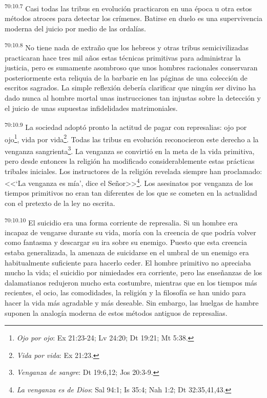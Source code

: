 \documentclass[twoside, 11pt]{book}
\begin{document}
\par
\textsuperscript{70:10.7} Casi todas las tribus en evolución practicaron en una época u otra estos métodos atroces para detectar los crímenes. Batirse en duelo es una supervivencia moderna del juicio por medio de las ordalías.

\par
\textsuperscript{70:10.8} No tiene nada de extraño que los hebreos y otras tribus semicivilizadas practicaran hace tres mil años estas técnicas primitivas para administrar la justicia, pero es sumamente asombroso que unos hombres racionales conservaran posteriormente esta reliquia de la barbarie en las páginas de una colección de escritos sagrados. La simple reflexión debería clarificar que ningún ser divino ha dado nunca al hombre mortal unas instrucciones tan injustas sobre la detección y el juicio de unas supuestas infidelidades matrimoniales.

\par
\textsuperscript{70:10.9} La sociedad adoptó pronto la actitud de pagar con represalias: ojo por ojo\footnote{\textit{Ojo por ojo}: Ex 21:23-24; Lv 24:20; Dt 19:21; Mt 5:38.}, vida por vida\footnote{\textit{Vida por vida}: Ex 21:23.}. Todas las tribus en evolución reconocieron este derecho a la venganza sangrienta\footnote{\textit{Venganza de sangre}: Dt 19:6,12; Jos 20:3-9.}. La venganza se convirtió en la meta de la vida primitiva, pero desde entonces la religión ha modificado considerablemente estas prácticas tribales iniciales. Los instructores de la religión revelada siempre han proclamado: <<`La venganza es mía', dice el Señor>>\footnote{\textit{La venganza es de Dios}: Sal 94:1; Is 35:4; Nah 1:2; Dt 32:35,41,43.}. Los asesinatos por venganza de los tiempos primitivos no eran tan diferentes de los que se cometen en la actualidad con el pretexto de la ley no escrita.

\par
\textsuperscript{70:10.10} El suicidio era una forma corriente de represalia. Si un hombre era incapaz de vengarse durante su vida, moría con la creencia de que podría volver como fantasma y descargar su ira sobre su enemigo. Puesto que esta creencia estaba generalizada, la amenaza de suicidarse en el umbral de un enemigo era habitualmente suficiente para hacerlo ceder. El hombre primitivo no apreciaba mucho la vida; el suicidio por nimiedades era corriente, pero las enseñanzas de los dalamatianos redujeron mucho esta costumbre, mientras que en los tiempos más recientes, el ocio, las comodidades, la religión y la filosofía se han unido para hacer la vida más agradable y más deseable. Sin embargo, las huelgas de hambre suponen la analogía moderna de estos métodos antiguos de represalias.
\end{document}
